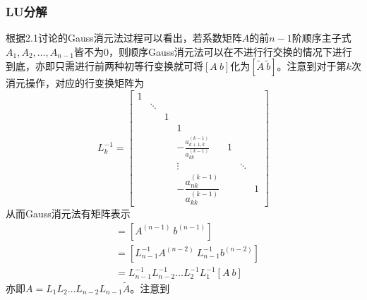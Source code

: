 \documentclass[UTF8,a4paper,10pt]{ctexart}
\begin{document}
            \subsubsection{LU分解}
                \par
                根据2.1讨论的Gauss消元法过程可以看出，若系数矩阵$A$的前$n-1$阶顺序主子式$A_1,A_2,\dots,A_{n-1}$皆不为0，则顺序Gauss消元法可以在不进行行交换的情况下进行到底，亦即只需进行前两种初等行变换就可将$[A\ b]$化为$[\tilde{A}\ \tilde{b}]$。注意到对于第$k$次消元操作，对应的行变换矩阵为
                $$
                L_k^{-1}=
                    \begin{bmatrix}
                        1 & \  & \  & \  & \  & \  & \  \\
                        \  & \ddots & \  & \  & \  & \  & \  \\
                        \  & \ & 1 & \  & \  & \  & \  \\
                        \  & \ & \  & 1 & \  & \  & \  \\
                        \  & \ & \  & -\frac{a_{k+1,k}^{(k-1)}}{a_{kk}^{(k-1)}} & 1 & \  & \  \\
                        \  & \ & \  & \vdots & \  & \ddots & \  \\
                        \  & \ & \  & -\dfrac{a_{nk}^{(k-1)}}{a_{kk}^{(k-1)}} & \  & \  & 1
                    \end{bmatrix}
                $$
                从而Gauss消元法有矩阵表示
                    \begin{align*}
                        [\tilde{A}\ \tilde{b}]&=[A^{(n-1)}\ b^{(n-1)}]\\
                        &=[L_{n-1}^{-1}A^{(n-2)}\ L_{n-1}^{-1}b^{(n-2)}]\\
                        &=L_{n-1}^{-1}L_{n-2}^{-1}\dots L_2^{-1}L_1^{-1}[A\ b]
                    \end{align*}
                亦即$A=L_1L_2\dots L_{n-2}L_{n-1}\tilde{A}$。注意到
\end{document}
